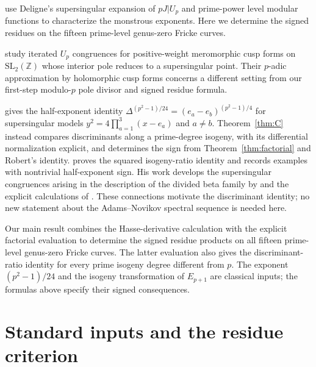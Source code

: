 \documentclass[11pt,a4paper]{article}
\numberwithin{equation}{section}
\theoremstyle{definition}
\theoremstyle{remark}
\newcommand{\Z}{\mathbb Z}
\begin{document}
\citet[Proposition~3.1 and \S4]{DS26} use Deligne's supersingular
expansion of $pJ|U_p$ and prime-power level modular functions to
characterize the monstrous exponents. Here we determine the signed
residues on the fifteen prime-level genus-zero Fricke curves.

\citet[Theorem~1.1]{BGKMR26} study iterated $U_p$ congruences for
positive-weight meromorphic cusp forms on $\mathrm{SL}_2(\Z)$ whose
interior pole reduces to a supersingular point. Their $p$-adic
approximation by holomorphic cusp forms concerns a different setting
from our first-step modulo-$p$ pole divisor and signed residue formula.

\citet[Theorem~3, p.~72; \S4]{Landweber88} gives the
half-exponent identity
$\Delta^{(p^2-1)/24}=(e_a-e_b)^{(p^2-1)/4}$ for supersingular
models $y^2=4\prod_{a=1}^3(x-e_a)$ and $a\ne b$.
Theorem~\ref{thm:C} instead compares discriminants along a prime-degree
isogeny, with its differential normalization explicit, and determines
the sign from Theorem~\ref{thm:factorial} and Robert's identity.
\citet[Theorem~1.2 and Remark~4]{Ono25}
proves the squared isogeny-ratio identity and records examples with nontrivial
half-exponent sign. His work develops the supersingular congruences arising in
the description of the divided beta family by \citet[Theorem~1.2]{Behrens09}
and the explicit calculations of \citet[\S5.4, Conjecture~5.17]{Larson20}.
These connections motivate the discriminant identity; no new statement about the
Adams--Novikov spectral sequence is needed here.

Our main result combines the Hasse-derivative calculation with the explicit
factorial evaluation to determine the signed residue products on all fifteen
prime-level genus-zero Fricke curves. The latter evaluation also gives the discriminant-ratio
identity for every prime isogeny degree different from $p$.
The exponent $(p^2-1)/24$ and the isogeny transformation of $E_{p+1}$
are classical inputs; the formulas above specify their signed consequences.

\section{Standard inputs and the residue criterion}\label{sec:imports}
\end{document}

